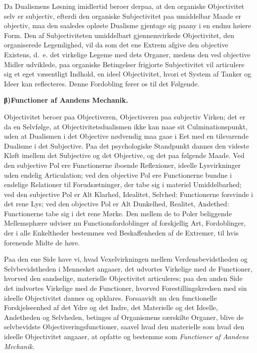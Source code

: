 \documentclass[12pt]{book}
\newcommand{\opage}[1]{\marginnote{\footnotesize\textit{[#1]}}}
\begin{document}
Da Dualismens Løsning imidlertid beroer derpaa, at den organiske Objectivitet selv er subjectiv,
efterdi den organiske Subjectivitet paa umiddelbar Maade er objectiv, maa den saaledes opløste
Dualisme gjentage sig paany i en endnu høiere Form. Den af Subjectiviteten umiddelbart gjennemvirkede
Objectivitet, den organiserede Legemlighed, vil da som det ene Extrem afgive den objective Existens,
d.\ e. det virkelige Legeme med dets Organer, medens den ved objective Midler udviklede, paa
organiske Betingelser frigjorte Subjectivitet vil articulere sig et eget væsentligt Indhold, en ideel
Objectivitet,
\opage{412} hvori et System af Tanker og Ideer kan reflecteres. Denne Fordobling fører os til det Følgende.

\begin{center}{\bfseries β)\quad Functioner af Aandens Mechanik.}\end{center}

Objectivitet beroer paa Objectiveren, Objectiveren paa subjectiv Virken; det er da en Selvfølge, at
Objectivitetsdualismen ikke kan naae sit Culminationspunkt, uden at Dualismen i det Objective
nødvendig maa gaae i Eet med en tilsvarende Dualisme i det Subjective. Paa det psychologiske
Standpunkt dannes den videste Kløft imellem det Subjective og det Objective, og det paa følgende
Maade. Ved den subjective Pol ere Functionerne iboende Reflexioner, ideelle Lysvirkninger uden
endelig Articulation; ved den objective Pol ere Functionerne bundne i endelige Relationer til
Forudsætninger, der tabe sig i materiel Umiddelbarhed; ved den subjective Pol er Alt Klarhed,
Idealitet, Selvhed: Functionerne forsvinde i det rene Lys; ved den objective Pol er Alt Dunkelhed,
Realitet, Andethed: Functionerne tabe sig i det rene Mørke. Den mellem de to Poler beliggende
Mellemsphære udviser nu Functionsfordoblinger af forskjellig Art, Fordoblinger, der i alle
Enkeltheder bestemmes ved Beskaffenheden af de Extremer, til hvis forenende Midte de høre.

Paa den ene Side have vi, hvad Vexelvirkningen mellem Verdensbevidstheden og Selvbevidstheden i
Mennesket angaaer, det udvortes Virkelige med de Functioner, hvorved den sandselige, materielle
Objectivitet articuleres; paa den anden Side det indvortes Virkelige med de Functioner, hvorved
Forestillingskredsen med sin ideelle Objectivitet dannes og opklares. Forsaavidt nu den functionelle
Forskjelseenhed af det Ydre og det Indre, det Materielle og det Ideelle, Andetheden og Selvheden,
betinges af Organismens særskilte Organer, blive de selvbevidste Objectiveringsfunctioner, saavel
hvad den materielle som hvad den ideelle Objectivitet angaaer, at opfatte og bestemme som
\emph{Functioner af Aandens Mechanik}.
\end{document}
